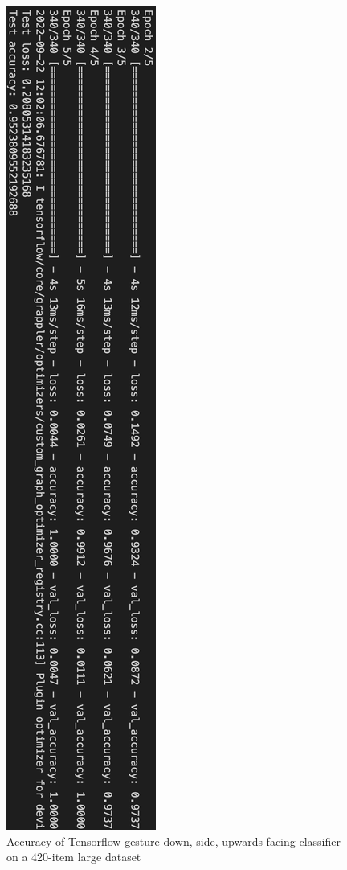 \begin{figure}[h]
    \centering
    \includegraphics[width=0.7\linewidth]{figures/tf_side_down_up_accuracy.png}
    \caption{Accuracy of Tensorflow gesture down, side, upwards facing classifier on a 420-item large dataset }
    \label{fig:tf_side_down_up_accuracy}
\end{figure}

